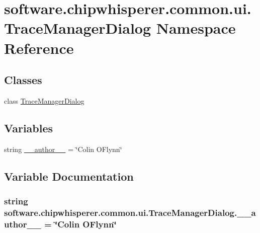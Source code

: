 \hypertarget{namespacesoftware_1_1chipwhisperer_1_1common_1_1ui_1_1TraceManagerDialog}{}\section{software.\+chipwhisperer.\+common.\+ui.\+Trace\+Manager\+Dialog Namespace Reference}
\label{namespacesoftware_1_1chipwhisperer_1_1common_1_1ui_1_1TraceManagerDialog}
\subsection*{Classes}
\begin{DoxyCompactItemize}
\item 
class \hyperlink{classsoftware_1_1chipwhisperer_1_1common_1_1ui_1_1TraceManagerDialog_1_1TraceManagerDialog}{Trace\+Manager\+Dialog}
\end{DoxyCompactItemize}
\subsection*{Variables}
\begin{DoxyCompactItemize}
\item 
string \hyperlink{namespacesoftware_1_1chipwhisperer_1_1common_1_1ui_1_1TraceManagerDialog_a3ac67a708d5374ce205b8030c473d65d}{\+\_\+\+\_\+author\+\_\+\+\_\+} = \char`\"{}Colin O\textquotesingle{}Flynn\char`\"{}
\end{DoxyCompactItemize}


\subsection{Variable Documentation}
\hypertarget{namespacesoftware_1_1chipwhisperer_1_1common_1_1ui_1_1TraceManagerDialog_a3ac67a708d5374ce205b8030c473d65d}{}
\subsubsection[{\+\_\+\+\_\+author\+\_\+\+\_\+}]{\setlength{\rightskip}{0pt plus 5cm}string software.\+chipwhisperer.\+common.\+ui.\+Trace\+Manager\+Dialog.\+\_\+\+\_\+author\+\_\+\+\_\+ = \char`\"{}Colin O\textquotesingle{}Flynn\char`\"{}}\label{namespacesoftware_1_1chipwhisperer_1_1common_1_1ui_1_1TraceManagerDialog_a3ac67a708d5374ce205b8030c473d65d}
